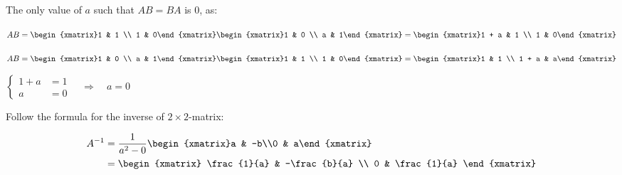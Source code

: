 \begin{exercise}{8}
  The only value of $a$ such that $AB = BA$ is $0$, as:
  \medskip

  $AB = \begin{xmatrix}1 & 1 \\ 1 & 0\end{xmatrix}
        \begin{xmatrix}1 & 0 \\ a & 1\end{xmatrix}
      = \begin{xmatrix}1 + a & 1 \\ 1 & 0\end{xmatrix}$
  \medskip

  $AB = \begin{xmatrix}1 & 0 \\ a & 1\end{xmatrix}
        \begin{xmatrix}1 & 1 \\ 1 & 0\end{xmatrix}
      = \begin{xmatrix}1 & 1 \\ 1 + a & a\end{xmatrix}$
  \medskip

  $\left\{
    \begin{aligned}
      1 + a &= 1 \\
          a &= 0
    \end{aligned}
  \right.\quad \Longrightarrow \quad a = 0$
\end{exercise}

\begin{exercise}{10}
  Follow the formula for the inverse of $2\times2$-matrix:

  \begin{align*}
    A^{-1} &= \frac{1}{a^2-0}\begin{xmatrix}a & -b\\0 & a\end{xmatrix} \\
           &= \begin{xmatrix}
                \frac{1}{a} & -\frac{b}{a} \\
                          0 &  \frac{1}{a}
              \end{xmatrix}
  \end{align*}
\end{exercise}

